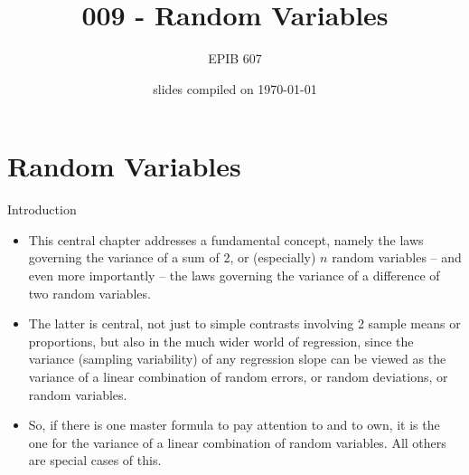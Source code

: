 \documentclass[10pt]{beamer}\usepackage[]{graphicx}\usepackage[]{color}
\begin{document}

\title{009 - Random Variables}
\author{EPIB 607}

\date{slides compiled on \today}

\maketitle

\section{Random Variables}

\begin{frame}{Introduction}

	\begin{itemize}
					  \setlength{\itemsep}{10pt}
		\item  This central chapter addresses a fundamental concept, namely the laws governing the variance of a sum of 2, or (especially) $n$ random variables  -- and even more importantly -- the laws governing the variance of a difference of two random variables. 
		\item The latter is  central, not just to simple contrasts involving 2 sample means or proportions, but also in the much wider world of regression, since the variance (sampling variability) of any regression slope can be viewed as the variance of a linear combination of random errors, or random deviations, or random variables.
		\item So, if there is one master formula to pay attention to and to own, it is the one for the variance of a linear combination of random variables. All others are special cases of this.
	\end{itemize}
	
\end{frame}
\end{document}
